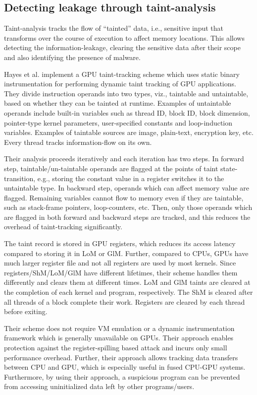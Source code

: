 
\subsection{Detecting leakage through taint-analysis}\label{sec:taintanalysis}
Taint-analysis tracks the flow of ``tainted'' data, i.e., sensitive input that transforms over the course of execution to affect memory locations. This allows detecting the  information-leakage, clearing the sensitive data after their scope and also identifying the presence of malware. 

Hayes et al. \cite{hayes2017gpu} implement a GPU taint-tracking scheme which uses static binary instrumentation for performing dynamic taint tracking of GPU applications. They divide instruction operands into two types, viz., taintable and untaintable, based on whether  they can be tainted at runtime.  Examples of untaintable operands include built-in variables such as thread ID, block ID, block dimension, pointer-type kernel parameters, user-specified constants and loop-induction variables. Examples of taintable sources are image, plain-text, encryption key, etc.  Every thread tracks information-flow on its own. 

Their analysis proceeds iteratively and each iteration has two steps. In forward step, taintable/un-taintable operands are flagged at the points of taint state-transition, e.g., storing the constant value in a register switches it to the  untaintable type. In backward step, operands which can affect memory value are flagged. Remaining variables cannot flow to memory even if they are taintable, such as stack-frame pointers, loop-counters, etc. Then, only those operands which are flagged in both forward and backward steps are tracked, and this reduces the overhead of taint-tracking significantly.  

The taint record is stored in GPU registers, which reduces its access latency compared to storing it in LoM or GlM. Further, compared to CPUs, GPUs have much larger register file  \cite{mittal2016SurveyCPURF,mittal2016SurveyGPURF} and not all registers are used by most kernels. Since registers/ShM/LoM/GlM have different lifetimes, their scheme handles them differently and clears them at different times. LoM and GlM  taints are cleared at the completion of each kernel and program, respectively. The ShM is cleared after all threads of a block complete their work. Registers are cleared by each thread before exiting. 


Their scheme does not require VM emulation or a dynamic instrumentation framework which is generally unavailable on GPUs. Their approach enables  protection against the register-spilling based attack \cite{pietro2016cuda} and incurs only small performance overhead. Further, their approach allows tracking data transfers between CPU and GPU, which is especially useful in fused CPU-GPU systems. Furthermore, by using their approach, a suspicious program can be prevented from accessing uninitialized data left by other programs/users. 

